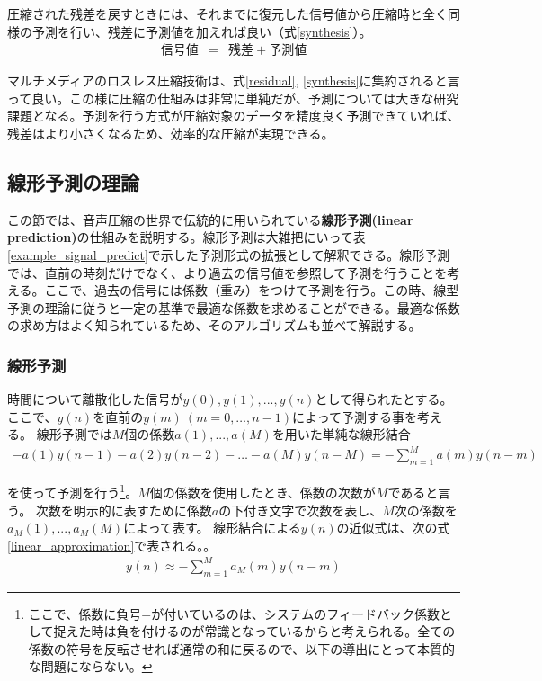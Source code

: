 \documentclass[uplatex,dvipdfmx,b5j,10pt]{jsbook}
\theoremstyle{definition}
\begin{document}
圧縮された残差を戻すときには、それまでに復元した信号値から圧縮時と全く同様の予測を行い、残差に予測値を加えれば良い（式\ref{synthesis}）。
\begin{eqnarray}
  信号値 &=& 残差 + 予測値 \label{synthesis}
\end{eqnarray}

マルチメディアのロスレス圧縮技術は、式\ref{residual}, \ref{synthesis}に集約されると言って良い。この様に圧縮の仕組みは非常に単純だが、予測については大きな研究課題となる。予測を行う方式が圧縮対象のデータを精度良く予測できていれば、残差はより小さくなるため、効率的な圧縮が実現できる。

\subsection{線形予測の理論}

この節では、音声圧縮の世界で伝統的に用いられている\textbf{線形予測(linear prediction)}の仕組みを説明する。線形予測は大雑把にいって表\ref{example_signal_predict}で示した予測形式の拡張として解釈できる。線形予測では、直前の時刻だけでなく、より過去の信号値を参照して予測を行うことを考える。ここで、過去の信号には係数（重み）をつけて予測を行う。この時、線型予測の理論に従うと一定の基準で最適な係数を求めることができる。最適な係数の求め方はよく知られている\cite{englishlevinsondubin}ため、そのアルゴリズムも並べて解説する。

\subsubsection{線形予測}

時間について離散化した信号が$y(0), y(1), ..., y(n)$として得られたとする。ここで、$y(n)$を直前の$y(m)\ (m=0,\dots,n-1)$によって予測する事を考える。
線形予測では$M$個の係数$a(1),...,a(M)$を用いた単純な線形結合
\begin{eqnarray*}
  -a(1)y(n-1) - a(2)y(n-2) - \dots - a(M)y(n-M) = - \sum_{m=1}^{M} a(m) y(n-m)
\end{eqnarray*}

を使って予測を行う\footnote{ここで、係数に負号$-$が付いているのは、システムのフィードバック係数として捉えた時は負を付けるのが常識となっているからと考えられる。全ての係数の符号を反転させれば通常の和に戻るので、以下の導出にとって本質的な問題にならない。}。$M$個の係数を使用したとき、係数の次数が$M$であると言う。
次数を明示的に表すために係数$a$の下付き文字で次数を表し、$M$次の係数を$a_{M}(1),...,a_{M}(M)$によって表す。
線形結合による$y(n)$の近似式は、次の式\ref{linear_approximation}で表される。。
\begin{eqnarray} \label{linear_approximation}
  y(n) \approx - \sum_{m=1}^{M} a_{M}(m) y(n-m)
\end{eqnarray}
\end{document}
